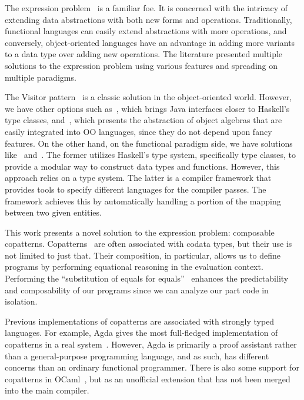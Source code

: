 The expression problem~\cite{ExpressionProblem} is a familiar foe.
It is concerned with the intricacy of extending data abstractions with both new forms and operations.
Traditionally, functional languages can easily extend abstractions with more operations, and conversely, object-oriented languages have an advantage in adding more variants to a data type over adding new operations.
The literature presented multiple solutions to the expression problem using various features and spreading on multiple paradigms.

The Visitor pattern~\cite{GangOfFour} is a classic solution in the object-oriented world.
However, we have other options such as~\cite{wehr_javagi_2011}, which brings Java interfaces closer to Haskell's type classes, and~\cite{hutchison_extensibility_2012}, which presents the abstraction of object algebras that are easily integrated into OO languages, since they do not depend upon fancy features.
On the other hand, on the functional paradigm side, we have solutions like~\cite{swierstra_data_2008} and~\cite{keep_nanopass_2013}.
The former utilizes Haskell's type system, specifically type classes, to provide a modular way to construct data types and functions.
However, this approach relies on a type system.
The latter is a compiler framework that provides tools to specify different languages for the compiler passes. The framework achieves this by automatically handling a portion of the mapping between two given entities.

This work presents a novel solution to the expression problem: composable copatterns.
Copatterns~\cite{APTS2013C} are often associated with codata types, but their use is not limited to just that.
Their composition, in particular, allows us to define programs by performing equational reasoning in the evaluation context.
Performing the ``substitution of equals for equals''~\cite{wadler_critique_1987} enhances the predictability and composability of our programs since we can analyze our part code in isolation.

Previous implementations of copatterns are associated with strongly typed languages.
For example, Agda gives the most full-fledged implementation of copatterns in a real system~\cite{ElaboratingDependentCopatterns}.
However, Agda is primarily a proof assistant rather than a general-purpose programming language, and as such, has different concerns than an ordinary functional programmer.
There is also some support for copatterns in OCaml~\cite{LaforgueR17}, but as an unofficial extension that has not been merged into the main compiler.

